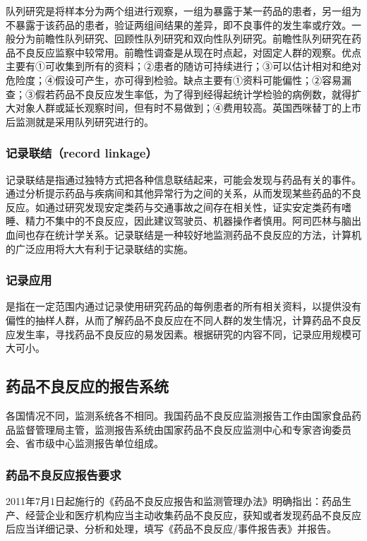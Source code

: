 队列研究是将样本分为两个组进行观察，一组为暴露于某一药品的患者，另一组为不暴露于该药品的患者，验证两组间结果的差异，即不良事件的发生率或疗效。一般分为前瞻性队列研究、回顾性队列研究和双向性队列研究。前瞻性队列研究在药品不良反应监察中较常用。前瞻性调查是从现在时点起，对固定人群的观察。优点主要有①可收集到所有的资料；②患者的随访可持续进行；③可以估计相对和绝对危险度；④假设可产生，亦可得到检验。缺点主要有①资料可能偏性；②容易漏查；③假若药品不良反应发生率低，为了得到经得起统计学检验的病例数，就得扩大对象人群或延长观察时间，但有时不易做到；④费用较高。英国西咪替丁的上市后监测就是采用队列研究进行的。

\subsubsection{记录联结（record linkage）}

记录联结是指通过独特方式把各种信息联结起来，可能会发现与药品有关的事件。通过分析提示药品与疾病间和其他异常行为之间的关系，从而发现某些药品的不良反应。如通过研究发现安定类药与交通事故之间存在相关性，证实安定类药有嗜睡、精力不集中的不良反应，因此建议驾驶员、机器操作者慎用。阿司匹林与脑出血间也存在统计学关系。记录联结是一种较好地监测药品不良反应的方法，计算机的广泛应用将大大有利于记录联结的实施。

\subsubsection{记录应用}

是指在一定范围内通过记录使用研究药品的每例患者的所有相关资料，以提供没有偏性的抽样人群，从而了解药品不良反应在不同人群的发生情况，计算药品不良反应发生率，寻找药品不良反应的易发因素。根据研究的内容不同，记录应用规模可大可小。

\subsection{药品不良反应的报告系统}

各国情况不同，监测系统各不相同。我国药品不良反应监测报告工作由国家食品药品监督管理局主管，监测报告系统由国家药品不良反应监测中心和专家咨询委员会、省市级中心监测报告单位组成。

\subsubsection{药品不良反应报告要求}

2011年7月1日起施行的《药品不良反应报告和监测管理办法》明确指出：药品生产、经营企业和医疗机构应当主动收集药品不良反应，获知或者发现药品不良反应后应当详细记录、分析和处理，填写《药品不良反应/事件报告表》并报告。

